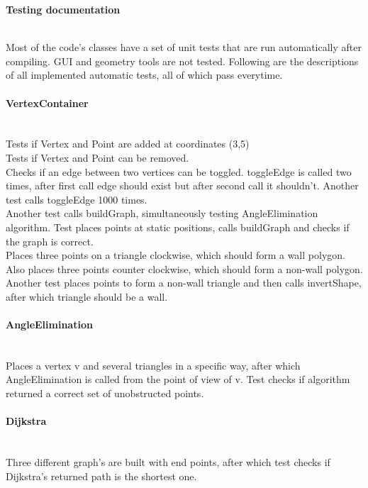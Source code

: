 \documentclass[a4paper,12pt]{article}
\begin{document}
\centerline{\huge \textbf{Testing documentation}} \hspace*{\fill}
\\
Most of the code's classes have a set of unit tests that are run automatically after compiling. GUI and geometry tools are not tested. Following are the descriptions of all implemented automatic tests, all of which pass everytime.\\
\paragraph{\large VertexContainer} \hspace{0pt} \\
Tests if Vertex and Point are added at coordinates (3,5)\\
Tests if Vertex and Point can be removed.\\
Checks if an edge between two vertices can be toggled. toggleEdge is called two times, after first call edge should exist but after second call it shouldn't. Another test calls toggleEdge 1000 times.\\ Another test calls buildGraph, simultaneously testing AngleElimination algorithm. Test places points at static positions, calls buildGraph and checks if the graph is correct.\\
Places three points on a triangle clockwise, which should form a wall polygon. Also places three points counter clockwise, which should form a non-wall polygon.\\
Another test places points to form a non-wall triangle and then calls invertShape, after which triangle should be a wall.\\
\paragraph{\large AngleElimination} \hspace{0pt} \\
Places a vertex v and several triangles in a specific way, after which AngleElimination is called from the point of view of v. Test checks if algorithm returned a correct set of unobstructed points.\\
\paragraph{\large Dijkstra} \hspace{0pt} \\
Three different graph's are built with end points, after which test checks if Dijkstra's returned path is the shortest one.
\end{document}

